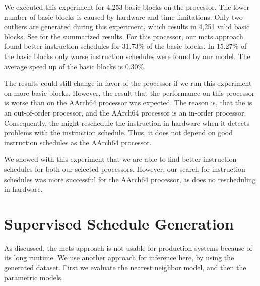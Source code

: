 We executed this experiment for 4,253 basic blocks on the \aurora processor.
The lower number of basic blocks is caused by hardware and time limitations.
Only two outliers are generated during this experiment, which results in 4,251 valid basic blocks.
See  for the summarized results.
For this processor, our \ac{mcts} approach found better instruction schedules for 31.73\% of the basic blocks.
In 15.27\% of the basic blocks only worse instruction schedules were found by our model.
The average speed up of the basic blocks is 0.30\%.

The results could still change in favor of the \aurora processor if we run this experiment on more basic blocks.
However, the result that the performance on this processor is worse than on the AArch64 processor was expected.
The reason is, that the \aurora is an out-of-order processor, and the AArch64 processor is an in-order processor.
Consequently, the \aurora might reschedule the instruction in hardware when it detects problems with the instruction schedule.
Thus, it does not depend on good instruction schedules as the AArch64 processor.

We showed with this experiment that we are able to find better instruction schedules for both our selected processors.
However, our search for instruction schedules was more successful for the AArch64 processor, as does no rescheduling in hardware.

\section{Supervised Schedule Generation}
\label{sec:eval:supervised}
As discussed, the \ac{mcts} approach is not usable for production systems because of its long runtime.
We use another approach for inference here, by using the generated dataset.
First we evaluate the nearest neighbor model, and then the parametric models.


